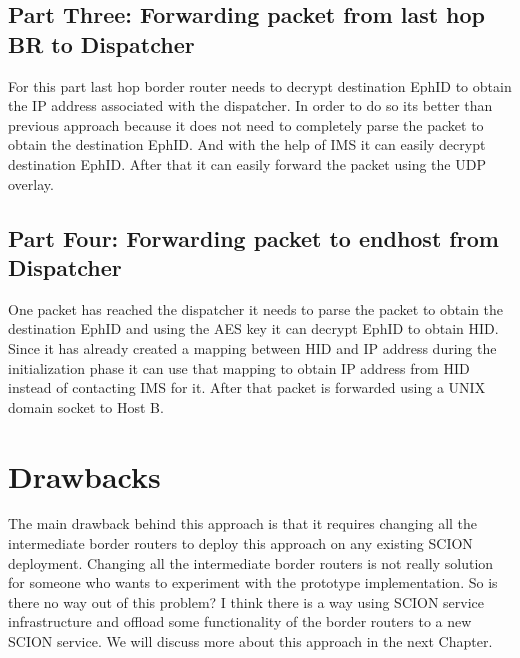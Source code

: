 \subsection{Part Three: Forwarding packet from last hop BR to Dispatcher}
For this part last hop border router needs to decrypt destination EphID to obtain the IP address associated with the dispatcher. In order to do so its better than previous approach because it does not need to completely parse the packet to obtain the destination EphID. And with the help of IMS it can easily decrypt destination EphID. After that it can easily forward the packet using the UDP overlay.

\subsection{Part Four: Forwarding packet to endhost from Dispatcher}
One packet has reached the dispatcher it needs to parse the packet to obtain the destination EphID and using the AES key it can decrypt EphID to obtain HID. Since it has already created a mapping between HID and IP address during the initialization phase it can use that mapping to obtain IP address from HID instead of contacting IMS for it. After that packet is forwarded using a UNIX domain socket to Host B.

  

\section{Drawbacks} \label{addr:drawback}
The main drawback behind this approach is that it requires changing all the intermediate border routers to deploy this approach on any existing SCION deployment. Changing all the intermediate border routers is not really solution for someone who wants to experiment with the prototype implementation. So is there no way out of this problem? I think there is a way using SCION service infrastructure and offload some functionality of the border routers to a new SCION service. We will discuss more about this approach in the next Chapter.
